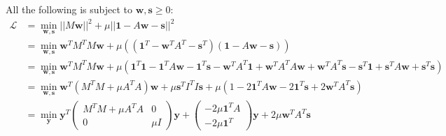 \documentclass[a4paper,final,11pt]{article}
\newcommand{\bm}[1]{\boldsymbol{#1}}
\begin{document}
	All the following is subject to $\bm{w},\bm{s}\geq0$:
\begin{align*}
\mathcal{L} &= \min_{\bm{w},\bm{s}} ||M\bm{w}||^2 + \mu||\mathbf{\bm{1}} - A\bm{w} - \bm{s}||^2 \\
	    &= \min_{\bm{w},\bm{s}} \bm{w}^TM^TM\bm{w} + \mu\left( (\bm{1}^T -\bm{w}^TA^T -\bm{s}^T)(\bm{1} - A\bm{w} - \bm{s})\right)\\
	    &= \min_{\bm{w},\bm{s}} \bm{w}^TM^TM\bm{w} + \mu\left( \bm{1}^T\bm{1} - \bm{1}^TA\bm{w} - \bm{1}^T\bm{s} -\bm{w}^TA^T\bm{1} +\bm{w}^TA^TA\bm{w} +\bm{w}^TA^T\bm{s}-\bm{s}^T\bm{1} +\bm{s}^T A\bm{w} +\bm{s}^T \bm{s}\right)\\
	    &= \min_{\bm{w},\bm{s}} \bm{w}^T(M^TM+\mu A^TA)\bm{w} +\mu \bm{s}^TI^TI\bm{s} +
	    \mu\left( 1 - 2 \bm{1}^TA\bm{w} - 2 \bm{1}^T\bm{s} +2\bm{w}^TA^T\bm{s}\right)\\
	    &= \min_{\bm{y}} \bm{y}^T
\begin{pmatrix}
M^TM+\mu A^TA & 0 \\
0 & \mu I
\end{pmatrix}\bm{y} +\begin{pmatrix}
-2\mu \bm{1}^TA \\
-2\mu \bm{1}^T
\end{pmatrix}\bm{y} +2\mu \bm{w}^TA^T\bm{s}\\
\end{align*}




\end{document}
